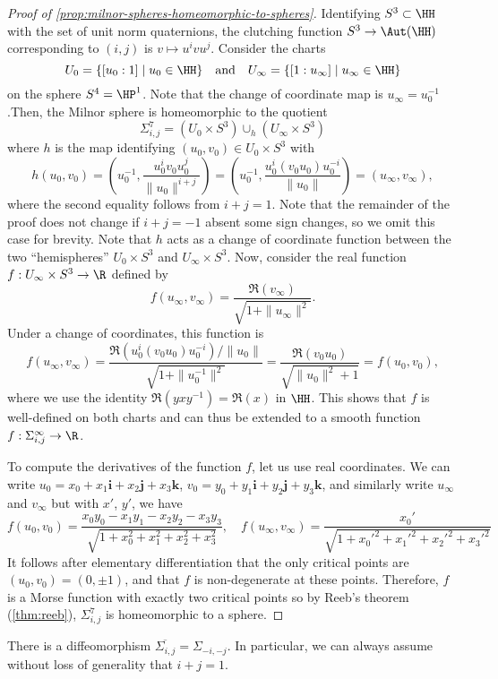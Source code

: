 \begin{proof}[Proof of \cref{prop:milnor-spheres-homeomorphic-to-spheres}]
	Identifying $S^3\subset \HH$ with the set of unit norm quaternions, the clutching function $S^3 \to \Aut(\HH)$ corresponding to $(i,j)$ is $v\mapsto u^ivu^j$. Consider the charts
	\[
		U_0 = \{ [u_0:1] \mid u_0\in \HH\}\quad\textrm{and}\quad U_\infty = \{ [1:u_\infty] \mid u_\infty\in \HH\}
	\]
	on the sphere $S^4=\HP^1$. Note that the change of coordinate map is $u_\infty=u_0^{-1}$.Then, the Milnor sphere is homeomorphic to the quotient
	\[
		\Sigma^7_{i,j} = (U_0 \times S^3)\cup_h (U_\infty\times S^3)
	\]
	where $h$ is the map identifying $(u_0,v_0)\in U_0\times S^3$ with
	\[
		h(u_0,v_0)= \left(u_0^{-1}, \frac{u_0^iv_0u_0^j}{\|u_0\|^{i+j}}\right) = \left(u_0^{-1}, \frac{u_0^i (v_0u_0) u_0^{-i}}{\|u_0\|}\right) = (u_\infty, v_\infty),
	\]
	where the second equality follows from $i+j=1$. Note that the remainder of the proof does not change if $i+j=-1$ absent some sign changes, so we omit this case for brevity.
	Note that $h$ acts as a change of coordinate function between the two ``hemispheres'' $U_0\times S^3$ and $U_\infty\times S^3$.
	Now, consider the real function $f : U_\infty\times S^3\to \R$ defined by
	\[
		f(u_\infty, v_\infty) = \frac{\Re(v_\infty)}{\sqrt{1+\|u_\infty\|^2}}.
	\]
	Under a change of coordinates, this function is
	\[
		f(u_\infty, v_\infty) = \frac{\Re(u_0^i(v_0u_0)u_0^{-i})/\|u_0\|}{\sqrt{1+\|u_0^{-1}\|^2}} = \frac{\Re(v_0u_0)}{\sqrt{\|u_0\|^2+1}}=f(u_0,v_0),
	\]
	where we use the identity $\Re(yxy^{-1})=\Re(x)$ in $\HH$. This shows that $f$ is well-defined on both charts and can thus be extended to a smooth function $f : \Sigma^\infty_{i,j} \to \R$.

	To compute the derivatives of the function $f$, let us use real coordinates. We can write $u_0=x_0+x_1\bm{i}+x_2\bm{j}+x_3\bm{k}$, $v_0 = y_0+y_1\bm{i}+y_2\bm{j}+y_3\bm{k}$, and similarly write $u_\infty$ and $v_\infty$ but with $x'$, $y'$, we have
	\[
		f(u_0, v_0) = \frac{x_0y_0 - x_1y_1 - x_2y_2 - x_3y_3}{\sqrt{1+x_0^2+x_1^2+x_2^2+x_3^2}},\quad
		f(u_\infty, v_\infty) = \frac{x_0'}{\sqrt{1+x_0'^2+x_1'^2+x_2'^2+x_3'^2}}
	\]
	It follows after elementary differentiation that the only critical points are $(u_0, v_0)= (0,\pm 1)$, and that $f$ is non-degenerate at these points. Therefore, $f$ is a Morse function with exactly two critical points so by Reeb's theorem (\ref{thm:reeb}), $\Sigma_{i,j}^7$ is homeomorphic to a sphere.
\end{proof}

\begin{proposition}
	There is a diffeomorphism $\overline{\Sigma_{i,j}}=\Sigma_{-i,-j}$. In particular, we can always assume without loss of generality that $i+j=1$.
\end{proposition}

